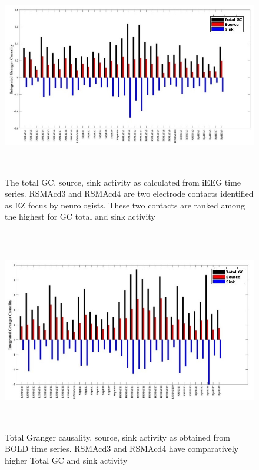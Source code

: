 \begin{figure}
\centerline{
	\includegraphics[height =3.5in]{Plots/GC_iEEG.jpg}
	}
	\caption{The total GC, source, sink activity as calculated from iEEG time series. RSMAcd3 and RSMAcd4 are two electrode contacts identified as EZ focus by neurologists. These two contacts are ranked among the highest for GC total and sink activity
	\label{fig:GC_EEG}
}
\end{figure}

\begin{figure}
\centerline{
	\includegraphics[height =3.5in]{Plots/GC_BOLD.jpg}
	}
	\caption{ Total Granger causality, source, sink activity as obtained from BOLD time series. RSMAcd3 and RSMAcd4 have comparatively higher Total GC and sink activity
	\label{fig:GC_BOLD}
}
\end{figure}


